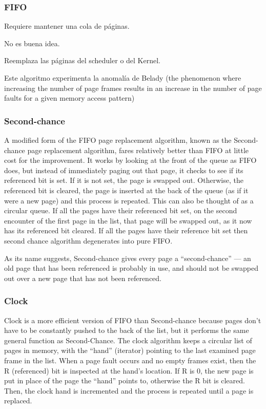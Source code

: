 \documentclass[a4paper, twoside]{article}
\begin{document}
\subsubsection{FIFO}

Requiere mantener una cola de páginas.

No es buena idea.

Reemplaza las páginas del scheduler o del Kernel.

Este algoritmo experimenta la anomalía de Belady (the phenomenon where
increasing the number of page frames results in an increase in the number of
page faults for a given memory access pattern)

\subsubsection{Second-chance}

A modified form of the FIFO page replacement algorithm, known as the
Second-chance page replacement algorithm, fares relatively better than FIFO at
little cost for the improvement.
It works by looking at the front of the queue as FIFO does, but instead of
immediately paging out that page, it checks to see if its referenced bit is
set. If it is not set, the page is swapped out.
Otherwise, the referenced bit is cleared, the page is inserted at the back of
the queue (as if it were a new page) and this process is repeated.
This can also be thought of as a circular queue.
If all the pages have their referenced bit set, on the second encounter of the
first page in the list, that page will be swapped out, as it now has its
referenced bit cleared.
If all the pages have their reference bit set then second chance algorithm
degenerates into pure FIFO.

As its name suggests, Second-chance gives every page a ``second-chance'' ---
an old page that has been referenced is probably in use, and should not be
swapped out over a new page that has not been referenced.

\subsubsection{Clock}

Clock is a more efficient version of FIFO than Second-chance because pages
don't have to be constantly pushed to the back of the list, but it performs the
same general function as Second-Chance.
The clock algorithm keeps a circular list of pages in memory, with the ``hand''
(iterator) pointing to the last examined page frame in the list.
When a page fault occurs and no empty frames exist, then the R (referenced) bit
is inspected at the hand's location.
If R is 0, the new page is put in place of the page the ``hand'' points to,
otherwise the R bit is cleared.
Then, the clock hand is incremented and the process is repeated until a page is
replaced.
\end{document}

